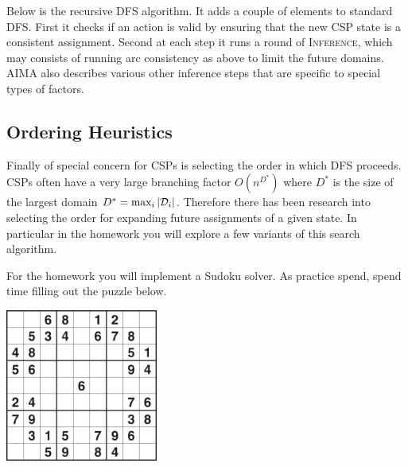 \documentclass[11pt]{article}
\begin{document}
\censor{}

\air

Below is the recursive DFS algorithm. It adds a couple of elements to standard DFS. First it checks if an action is valid by ensuring that the
new CSP state is a consistent assignment. Second at  each  
step it runs a round of \textsc{Inference},  
which may consists of running arc consistency as above to limit the future domains. AIMA 
also describes various other inference steps that are specific to 
special types of factors.

\begin{algorithm}[h]
\begin{algorithmic}[1]
  \EndIf{}
   
  \EndIf{}
   

  \EndIf{}

  \EndIf{}
  \EndFor{}
  \EndProcedure{}
\end{algorithmic}
\end{algorithm}

\subsection{Ordering Heuristics}
  
Finally of special concern for CSPs is selecting the order in which DFS 
proceeds. CSPs often have a very large branching factor $O(n^{D^*})$ where 
$D^*$ is the size of the largest domain $D^* = \max_{i} |\mathcal{D}_i|$. Therefore 
there has been research into selecting the order for expanding future 
assignments of a given state. In particular in the homework you will explore a few variants of this search algorithm.

\begin{exercise}
  For the homework you will implement a Sudoku solver. As practice spend, spend time filling out the puzzle below.
\end{exercise}

\begin{center}
  \includegraphics[width=5cm]{sudoku}
\end{center}
\end{document}
